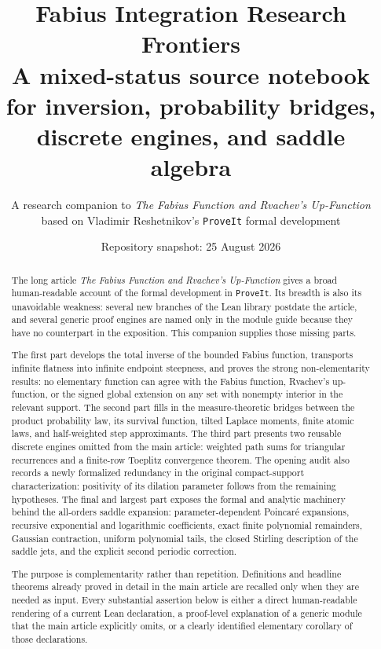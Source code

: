 \documentclass[11pt,oneside]{article}
\title{\bfseries Fabius Integration Research Frontiers\\[0.35em]
\large A mixed-status source notebook for inversion, probability bridges,\\
discrete engines, and saddle algebra}
\author{A research companion to \emph{The Fabius Function and Rvachev's Up-Function}\\
\small based on Vladimir Reshetnikov's \texttt{ProveIt} formal development}
\date{Repository snapshot: 25 August 2026}
\theoremstyle{definition}
\theoremstyle{remark}
\begin{document}
\maketitle

\begin{abstract}
The long article \emph{The Fabius Function and Rvachev's Up-Function} gives a broad
human-readable account of the formal development in \texttt{ProveIt}.  Its breadth is also
its unavoidable weakness: several new branches of the Lean library postdate the article,
and several generic proof engines are named only in the module guide because they have no
counterpart in the exposition.  This companion supplies those missing parts.

The first part develops the total inverse of the bounded Fabius function, transports
infinite flatness into infinite endpoint steepness, and proves the strong non-elementarity
results: no elementary function can agree with the Fabius function, Rvachev's up-function,
or the signed global extension on any set with nonempty interior in the relevant support.
The second part fills in the measure-theoretic bridges between the product probability law,
its survival function, tilted Laplace moments, finite atomic laws, and half-weighted step
approximants.  The third part presents two reusable discrete engines omitted from the main
article: weighted path sums for triangular recurrences and a finite-row Toeplitz convergence
theorem.  The opening audit also records a newly formalized redundancy in the original
compact-support characterization: positivity of its dilation parameter follows from the
remaining hypotheses.  The final and largest part exposes the formal and analytic machinery behind the
all-orders saddle expansion: parameter-dependent Poincar\'e expansions, recursive
exponential and logarithmic coefficients, exact finite polynomial remainders, Gaussian
contraction, uniform polynomial tails, the closed Stirling description of the saddle jets,
and the explicit second periodic correction.

The purpose is complementarity rather than repetition.  Definitions and headline theorems
already proved in detail in the main article are recalled only when they are needed as input.
Every substantial assertion below is either a direct human-readable rendering of a current
Lean declaration, a proof-level explanation of a generic module that the main article
explicitly omits, or a clearly identified elementary corollary of those declarations.
\end{abstract}
\end{document}
